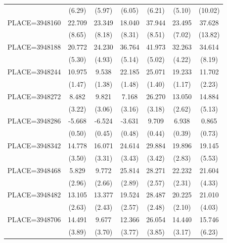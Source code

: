 {\begin{tabular}{l*{6}{c}}
                    &      (6.29)&      (5.97)&      (6.05)&      (6.21)&      (5.10)&     (10.02)\\
PLACE=3948160       &      22.709&      23.349&      18.040&      37.944&      23.495&      37.628\\
                    &      (8.65)&      (8.18)&      (8.31)&      (8.51)&      (7.02)&     (13.82)\\
PLACE=3948188       &      20.772&      24.230&      36.764&      41.973&      32.263&      34.614\\
                    &      (5.30)&      (4.93)&      (5.14)&      (5.02)&      (4.22)&      (8.19)\\
PLACE=3948244       &      10.975&       9.538&      22.185&      25.071&      19.233&      11.702\\
                    &      (1.47)&      (1.38)&      (1.48)&      (1.40)&      (1.17)&      (2.23)\\
PLACE=3948272       &       8.482&       9.821&       7.168&      26.270&      13.050&      14.884\\
                    &      (3.22)&      (3.06)&      (3.16)&      (3.18)&      (2.62)&      (5.13)\\
PLACE=3948286       &      -5.668&      -6.524&      -3.631&       9.709&       6.938&       0.865\\
                    &      (0.50)&      (0.45)&      (0.48)&      (0.44)&      (0.39)&      (0.73)\\
PLACE=3948342       &      14.778&      16.071&      24.614&      29.884&      19.896&      19.145\\
                    &      (3.50)&      (3.31)&      (3.43)&      (3.42)&      (2.83)&      (5.53)\\
PLACE=3948468       &       5.829&       9.772&      25.814&      28.271&      22.232&      21.604\\
                    &      (2.96)&      (2.66)&      (2.89)&      (2.57)&      (2.31)&      (4.33)\\
PLACE=3948482       &      13.105&      13.377&      19.524&      28.487&      20.225&      21.010\\
                    &      (2.63)&      (2.43)&      (2.57)&      (2.48)&      (2.10)&      (4.03)\\
PLACE=3948706       &      14.491&       9.677&      12.366&      26.054&      14.440&      15.746\\
                    &      (3.89)&      (3.70)&      (3.77)&      (3.85)&      (3.17)&      (6.23)\\

\end{tabular}}
